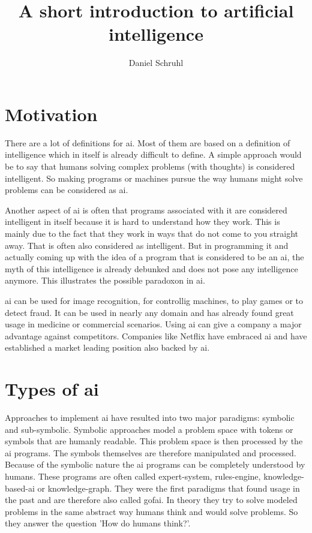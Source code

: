 \documentclass[jou,apacite]{apa6}
\title{A short introduction to artificial intelligence}
\author{Daniel Schruhl}
\affiliation{ThoughtWorks}
\begin{document}
\maketitle    
                        
\section{Motivation}
There are a lot of definitions for \gls{ai}. Most of them are based on a definition of intelligence which in itself is already difficult to define. A simple approach would be to say that humans solving complex problems (with thoughts) is considered intelligent. So making programs or machines pursue the way humans might solve problems can be considered as \gls{ai}.

Another aspect of \gls{ai} is often that programs associated with it are considered intelligent in itself because it is hard to understand how they work. This is mainly due to the fact that they work in ways that do not come to you straight away. That is often also considered as intelligent.
But in programming it and actually coming up with the idea of a program that is considered to be an \gls{ai}, the myth of this intelligence is already debunked and does not pose any intelligence anymore. This illustrates the possible paradoxon in \gls{ai}.

\gls{ai} can be used for image recognition, for controllig machines, to play games or to detect fraud. It can be used in nearly any domain and has already found great usage in medicine or commercial scenarios. Using \gls{ai} can give a company a major advantage against competitors. Companies like Netflix have embraced \gls{ai} \cite{Gomez-Uribe2015} and have established a market leading position also backed by \gls{ai}.

\section{Types of \gls{ai}}
Approaches to implement \gls{ai} have resulted into two major paradigms: symbolic and sub-symbolic. Symbolic approaches model a problem space with tokens or symbols that are humanly readable. This problem space is then processed by the \gls{ai} programs. The symbols themselves are therefore manipulated and processed. Because of the symbolic nature the \gls{ai} programs can be completely understood by humans. These programs are often called \gls{expert-system}, \gls{rules-engine}, \gls{knowledge-based-ai} or \gls{knowledge-graph}. They were the first paradigms that found usage in the past and are therefore also called \gls{gofai}. In theory they try to solve modeled problems in the same abstract way humans think and would solve problems. So they answer the question 'How do humans think?'.
\end{document}
